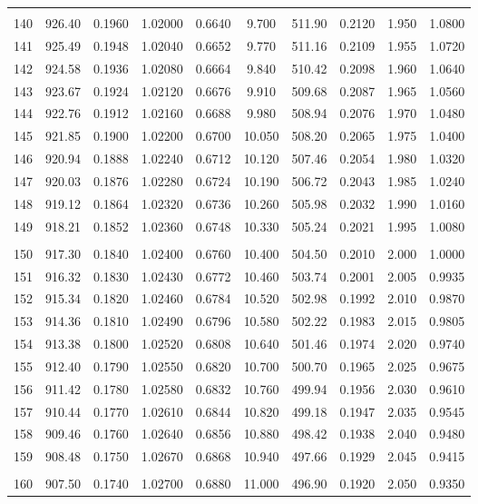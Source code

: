 \documentclass[letter,twosides,10pt]{article}
\begin{document}
\begin{longtable}{|c|c|c|c|c|c|c|c|c|c|}
 & & & & & & & & & \\ 
140 & 926.40 & 0.1960 & 1.02000 & 0.6640 &  9.700 & 511.90 & 0.2120 & 1.950 &  1.0800 \\
141 & 925.49 & 0.1948 & 1.02040 & 0.6652 &  9.770 & 511.16 & 0.2109 & 1.955 &  1.0720 \\
142 & 924.58 & 0.1936 & 1.02080 & 0.6664 &  9.840 & 510.42 & 0.2098 & 1.960 &  1.0640 \\
143 & 923.67 & 0.1924 & 1.02120 & 0.6676 &  9.910 & 509.68 & 0.2087 & 1.965 &  1.0560 \\
144 & 922.76 & 0.1912 & 1.02160 & 0.6688 &  9.980 & 508.94 & 0.2076 & 1.970 &  1.0480 \\
145 & 921.85 & 0.1900 & 1.02200 & 0.6700 & 10.050 & 508.20 & 0.2065 & 1.975 &  1.0400 \\
146 & 920.94 & 0.1888 & 1.02240 & 0.6712 & 10.120 & 507.46 & 0.2054 & 1.980 &  1.0320 \\
147 & 920.03 & 0.1876 & 1.02280 & 0.6724 & 10.190 & 506.72 & 0.2043 & 1.985 &  1.0240 \\
148 & 919.12 & 0.1864 & 1.02320 & 0.6736 & 10.260 & 505.98 & 0.2032 & 1.990 &  1.0160 \\
149 & 918.21 & 0.1852 & 1.02360 & 0.6748 & 10.330 & 505.24 & 0.2021 & 1.995 &  1.0080 \\
 & & & & & & & & & \\ 
150 & 917.30 & 0.1840 & 1.02400 & 0.6760 & 10.400 & 504.50 & 0.2010 & 2.000 &  1.0000 \\
151 & 916.32 & 0.1830 & 1.02430 & 0.6772 & 10.460 & 503.74 & 0.2001 & 2.005 &  0.9935 \\
152 & 915.34 & 0.1820 & 1.02460 & 0.6784 & 10.520 & 502.98 & 0.1992 & 2.010 &  0.9870 \\
153 & 914.36 & 0.1810 & 1.02490 & 0.6796 & 10.580 & 502.22 & 0.1983 & 2.015 &  0.9805 \\
154 & 913.38 & 0.1800 & 1.02520 & 0.6808 & 10.640 & 501.46 & 0.1974 & 2.020 &  0.9740 \\
155 & 912.40 & 0.1790 & 1.02550 & 0.6820 & 10.700 & 500.70 & 0.1965 & 2.025 &  0.9675 \\
156 & 911.42 & 0.1780 & 1.02580 & 0.6832 & 10.760 & 499.94 & 0.1956 & 2.030 &  0.9610 \\
157 & 910.44 & 0.1770 & 1.02610 & 0.6844 & 10.820 & 499.18 & 0.1947 & 2.035 &  0.9545 \\
158 & 909.46 & 0.1760 & 1.02640 & 0.6856 & 10.880 & 498.42 & 0.1938 & 2.040 &  0.9480 \\
159 & 908.48 & 0.1750 & 1.02670 & 0.6868 & 10.940 & 497.66 & 0.1929 & 2.045 &  0.9415 \\
 & & & & & & & & & \\ 
160 & 907.50 & 0.1740 & 1.02700 & 0.6880 & 11.000 & 496.90 & 0.1920 & 2.050 &  0.9350 \\

\end{longtable}
\end{document}
